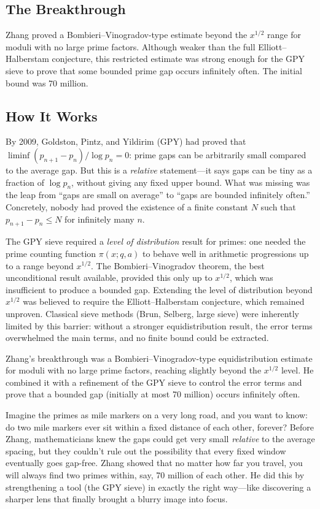 \subsection{The Breakthrough}
Zhang proved a Bombieri--Vinogradov-type estimate beyond the $x^{1/2}$ range for moduli with no large prime factors. Although weaker than the full Elliott--Halberstam conjecture, this restricted estimate was strong enough for the GPY sieve to prove that some bounded prime gap occurs infinitely often. The initial bound was 70 million.

\subsection{How It Works}

By 2009, Goldston, Pintz, and Yildirim (GPY) had proved that $\liminf (p_{n+1} - p_n)/\log p_n = 0$: prime gaps can be arbitrarily small compared to the average gap. But this is a \emph{relative} statement---it says gaps can be tiny as a fraction of $\log p_n$, without giving any fixed upper bound. What was missing was the leap from ``gaps are small on average'' to ``gaps are bounded infinitely often.'' Concretely, nobody had proved the existence of a finite constant $N$ such that $p_{n+1} - p_n \leq N$ for infinitely many $n$.

The GPY sieve required a \emph{level of distribution} result for primes: one needed the prime counting function $\pi(x; q, a)$ to behave well in arithmetic progressions up to a range beyond $x^{1/2}$. The Bombieri--Vinogradov theorem, the best unconditional result available, provided this only up to $x^{1/2}$, which was insufficient to produce a bounded gap. Extending the level of distribution beyond $x^{1/2}$ was believed to require the Elliott--Halberstam conjecture, which remained unproven. Classical sieve methods (Brun, Selberg, large sieve) were inherently limited by this barrier: without a stronger equidistribution result, the error terms overwhelmed the main terms, and no finite bound could be extracted.

Zhang's breakthrough was a Bombieri--Vinogradov-type equidistribution estimate for moduli with no large prime factors, reaching slightly beyond the $x^{1/2}$ level. He combined it with a refinement of the GPY sieve to control the error terms and prove that a bounded gap (initially at most 70 million) occurs infinitely often.

Imagine the primes as mile markers on a very long road, and you want to know: do two mile markers ever sit within a fixed distance of each other, forever? Before Zhang, mathematicians knew the gaps could get very small \emph{relative} to the average spacing, but they couldn't rule out the possibility that every fixed window eventually goes gap-free. Zhang showed that no matter how far you travel, you will always find two primes within, say, 70 million of each other. He did this by strengthening a tool (the GPY sieve) in exactly the right way---like discovering a sharper lens that finally brought a blurry image into focus.

